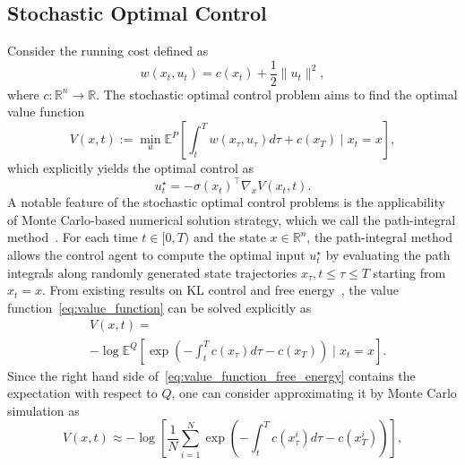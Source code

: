 \documentclass[letterpaper]{article} %
\begin{document}
\subsection{Stochastic Optimal Control}
Consider the running cost defined as
\begin{equation}
\label{eq:quadratic_cost_function}
    w(x_t, u_t)=c(x_t)+\frac{1}{2}\|u_t\|^2,
\end{equation}
where $c: \mathbb{R}^n \rightarrow \mathbb{R}$.
The stochastic optimal control problem aims to find the optimal value function
\begin{equation}
\label{eq:value_function}
    V(x, t):=\min_{u}\mathbb{E}^{P}\left[\int_{t}^{T} w(x_\tau, u_\tau) d \tau+c\left(x_{T}\right) \mid x_{t}=x\right],
\end{equation}
which explicitly yields the optimal control  as
\begin{equation}
\label{eq:optimal_control_from_V}
    u_t^{\star}=-\sigma\left(x_t\right)^\top \nabla_x V\left(x_t, t\right).
\end{equation}
A notable feature of the stochastic optimal control problems is the applicability of Monte Carlo-based numerical solution strategy, which we call the path-integral method~\cite{thijssen2015path}. For each time $t \in[0, T)$ and the state $x \in \mathbb{R}^{n}$, the path-integral method allows the control agent to compute the optimal input $u_t^{\star}$ by evaluating the path integrals along randomly generated state trajectories $x_{\tau}, t \leq \tau \leq T$ starting from $x_{t}=x$.
From existing results on KL control and free energy~\cite{fleming2006controlled, boue1998variational, theodorou2012relative}, the value function~\eqref{eq:value_function} can be solved explicitly as
\begin{equation}
\label{eq:value_function_free_energy}
\begin{aligned}
    & V(x, t) = \\
    & -\log \mathbb{E}^{Q}\left[\exp \left(- \int_{t}^{T} c\left(x_{\tau}\right) d \tau- c\left(x_{T}\right)\right) \mid x_{t}=x\right].
\end{aligned}
\end{equation}
Since the right hand side of~\eqref{eq:value_function_free_energy} contains the expectation with respect to $Q$, one can consider approximating it by Monte Carlo simulation as
\begin{equation}
\label{eq:path_integral_MC_estimation}
    V(x, t) \approx
     - \log \left[\frac{1}{N} \sum_{i=1}^{N} \exp \left(- \int_{t}^{T} c\left(x_{\tau}^{i}\right) d \tau- c\left(x_{T}^{i}\right)\right)\right],
\end{equation}
\end{document}
